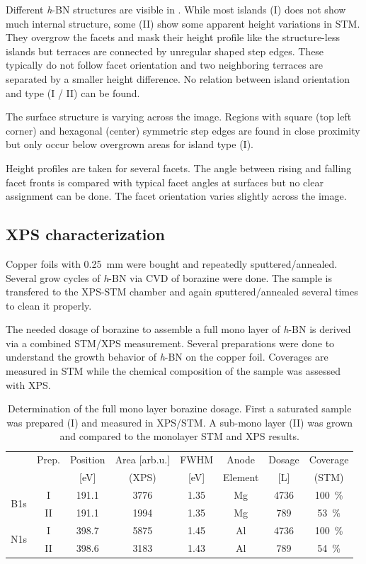 Different \textit{h}-BN structures are visible in . While most islands (I) does not show much internal structure, some (II) show some apparent height variations in STM. They overgrow the facets and mask their height profile like the structure-less islands but terraces are connected by unregular shaped step edges. These typically do not follow facet orientation and two neighboring terraces are separated by a smaller height difference.  No relation between island orientation and type (I / II) can be found.

The surface structure is varying across the image. Regions with square (top left corner) and hexagonal (center) symmetric step edges are found in close proximity but only occur below overgrown areas for island type (I). 

Height profiles are taken for several facets. The angle between rising and falling facet fronts is compared with typical facet angles at surfaces but no clear assignment can be done. The facet orientation varies slightly across the image. 

\FloatBarrier

\subsection{XPS characterization}
Copper foils with \SI{0.25}{\mm} were bought and repeatedly sputtered/annealed. Several grow cycles of \textit{h}-BN via CVD of borazine were done.  The sample is transfered to the XPS-STM chamber and again sputtered/annealed several times to clean it properly.

The needed dosage of borazine to assemble a full mono layer of \textit{h}-BN is derived via a combined STM/XPS measurement. Several preparations were done to understand the growth behavior of \textit{h}-BN on the copper foil. Coverages are measured in STM while the chemical composition of the sample was assessed with XPS.
\begin{table}[h!]
	\centering
	\caption{Determination of the full mono layer borazine dosage. First a saturated sample was prepared (I) and measured in XPS/STM. A sub-mono layer (II) was grown and compared to the monolayer STM and XPS results.}
	\begin{tabular}{cccccccc}
		& Prep. & Position    & Area [arb.u.] & FWHM  & Anode & Dosage  & Coverage\\ 
		&	  &	[eV]	& (XPS)		&[eV]	&Element&[L]	  & (STM) \\ \hline \hline
		\multirow{2}{*}{B1s} 	&I& 191.1 & 3776 & 1.35 & Mg & 4736 & \SI{100}{\percent}\\
		&II& 191.1 & 1994 & 1.35 & Mg & 789 &\SI{53}{\percent}\\ \hline
		\multirow{2}{*}{N1s} 	&I& 398.7 & 5875 & 1.45 & Al  & 4736 & \SI{100}{\percent}\\
		&II& 398.6 & 3183 & 1.43 & Al & 789 &\SI{54}{\percent}\\
	\end{tabular}
\end{table}

